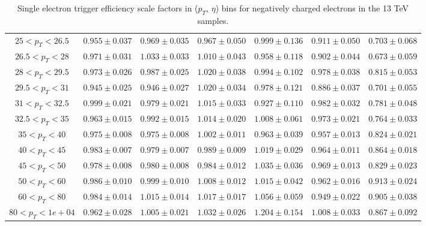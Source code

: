 \begin{table}
\begin{center}
{\begin{tabular}{ccccccc}
\hline \hline
$25<p_{T}<26.5$ & $0.955 \pm 0.037$ & $0.969 \pm 0.035$ & $0.967 \pm 0.050$ & $0.999 \pm 0.136$ & $0.911 \pm 0.050$ & $0.703 \pm 0.068$  \\
$26.5<p_{T}<28$ & $0.971 \pm 0.031$ & $1.033 \pm 0.033$ & $1.010 \pm 0.043$ & $0.958 \pm 0.118$ & $0.902 \pm 0.044$ & $0.673 \pm 0.059$  \\
$28<p_{T}<29.5$ & $0.973 \pm 0.026$ & $0.987 \pm 0.025$ & $1.020 \pm 0.038$ & $0.994 \pm 0.102$ & $0.978 \pm 0.038$ & $0.815 \pm 0.053$  \\
$29.5<p_{T}<31$ & $0.945 \pm 0.025$ & $0.946 \pm 0.027$ & $1.020 \pm 0.034$ & $0.978 \pm 0.121$ & $0.886 \pm 0.037$ & $0.701 \pm 0.055$  \\
$31<p_{T}<32.5$ & $0.999 \pm 0.021$ & $0.979 \pm 0.021$ & $1.015 \pm 0.033$ & $0.927 \pm 0.110$ & $0.982 \pm 0.032$ & $0.781 \pm 0.048$  \\
$32.5<p_{T}<35$ & $0.963 \pm 0.015$ & $0.992 \pm 0.015$ & $1.014 \pm 0.020$ & $1.008 \pm 0.061$ & $0.973 \pm 0.021$ & $0.764 \pm 0.033$  \\
$35<p_{T}<40$ & $0.975 \pm 0.008$ & $0.975 \pm 0.008$ & $1.002 \pm 0.011$ & $0.963 \pm 0.039$ & $0.957 \pm 0.013$ & $0.824 \pm 0.021$  \\
$40<p_{T}<45$ & $0.983 \pm 0.007$ & $0.979 \pm 0.007$ & $0.989 \pm 0.009$ & $1.019 \pm 0.029$ & $0.964 \pm 0.011$ & $0.864 \pm 0.018$  \\
$45<p_{T}<50$ & $0.978 \pm 0.008$ & $0.980 \pm 0.008$ & $0.984 \pm 0.012$ & $1.035 \pm 0.036$ & $0.969 \pm 0.013$ & $0.829 \pm 0.023$  \\
$50<p_{T}<60$ & $0.986 \pm 0.010$ & $0.999 \pm 0.010$ & $1.008 \pm 0.012$ & $1.015 \pm 0.042$ & $0.962 \pm 0.016$ & $0.913 \pm 0.024$  \\
$60<p_{T}<80$ & $0.984 \pm 0.014$ & $1.015 \pm 0.014$ & $1.017 \pm 0.017$ & $1.056 \pm 0.059$ & $0.949 \pm 0.022$ & $0.905 \pm 0.038$  \\
$80<p_{T}<1e+04$ & $0.962 \pm 0.028$ & $1.005 \pm 0.021$ & $1.032 \pm 0.026$ & $1.204 \pm 0.154$ & $1.008 \pm 0.033$ & $0.867 \pm 0.092$  \\
\hline
\end{tabular}}
\end{center}
\caption{Single electron trigger efficiency scale factors in ($p_T$, $\eta$) bins for negatively charged electrons in the 13 TeV samples.}
\label{tab:Eff:el:13TeV:HLT:neg}
\end{table}
